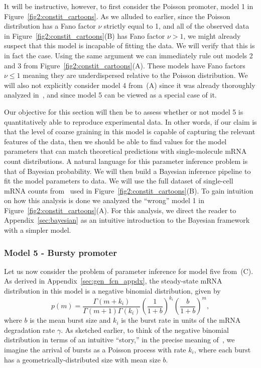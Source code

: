 It will be instructive, however, to first consider the Poisson promoter, model 1
in Figure~\ref{fig2:constit_cartoons}. As we alluded to earlier, since the
Poisson distribution has a Fano factor $\nu$ strictly equal to 1, and all of the
observed data in Figure~\ref{fig2:constit_cartoons}(B) has Fano factor $\nu>1$,
we might already suspect that this model is incapable of fitting the data. We
will verify that this is in fact the case. Using the same argument we can
immediately rule out models 2 and 3 from Figure~\ref{fig2:constit_cartoons}(A).
These models have Fano factors $\nu\le 1$ meaning they are underdispersed
relative to the Poisson distribution. We will also not explicitly consider model
4 from~(A) since it was already thoroughly analyzed
in~\cite{Razo-Mejia2020}, and since model 5 can be viewed as a special case of
it.

Our objective for this section will then be to assess whether or not model 5 is
quantitatively able to reproduce experimental data. In other words, if our claim
is that the level of coarse graining in this model is capable of capturing the
relevant features of the data, then we should be able to find values for the
model parameters that can match theoretical predictions with single-molecule
mRNA count distributions. A natural language for this parameter inference
problem is that of Bayesian probability. We will then build a Bayesian inference
pipeline to fit the model parameters to data. We will use the full dataset of
single-cell mRNA counts from~\cite{Jones2014} used in
Figure~\ref{fig2:constit_cartoons}(B). To gain intuition on how this analysis is
done we analyzed the ``wrong'' model 1 in Figure~\ref{fig2:constit_cartoons}(A).
For this analysis, we direct the reader to Appendix~\ref{sec:bayesian} as an
intuitive introduction to the Bayesian framework with a simpler model.

\subsubsection{Model 5 - Bursty promoter}

Let us now consider the problem of parameter inference for model five
from~(C). As derived in
Appendix~\ref{sec:gen_fcn_appdx}, the steady-state mRNA distribution in this
model is a negative binomial distribution, given by
\begin{equation}
p(m) = \frac{\Gamma(m+k_i)}{\Gamma(m+1)\Gamma(k_i)}
        \left(\frac{1}{1+b}\right)^{k_i}
        \left(\frac{b}{1+b}\right)^m,
\label{eq:neg_bionom}
\end{equation}
where $b$ is the mean burst size and $k_i$ is the burst rate in units of the
mRNA degradation rate $\gamma$. As sketched earlier, to think of the negative
binomial distribution in terms of an intuitive ``story,'' in the precise
meaning of~\cite{Blitzstein2015}, we imagine the arrival of
bursts as a Poisson process with rate $k_i$, where each burst has a
geometrically-distributed size with mean size $b$.

